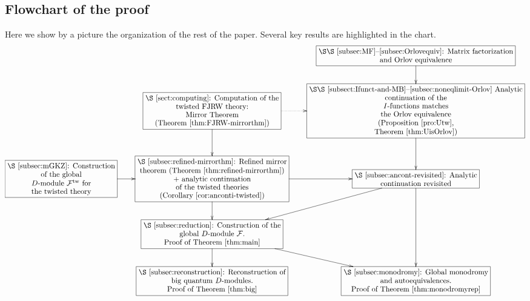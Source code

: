 \documentclass[11pt]{amsart}
\theoremstyle{definition} %
\theoremstyle{remark} %
\newcommand{\tw}{{\rm tw}}
\newcommand{\cF}{\mathcal{F}}
\begin{document}
\subsection{Flowchart of the proof} 
\label{subsec:flowchart} 
Here we show by a picture 
the organization of the rest of the paper. 
Several key results are highlighted in the chart. 
\[
\xymatrix{
& 
& 
*+[F]\txt{\S\S \ref{subsec:MF}--\ref{subsec:Orlovequiv}: 
Matrix factorization \\ and Orlov equivalence }
\ar[d] \\ 
& 
*+[F]\txt{\S \ref{sect:computing}:  
Computation of the \\ 
twisted FJRW theory: \\ 
Mirror Theorem \\
(Theorem \ref{thm:FJRW-mirrorthm})} 
 \ar[d] 
 \ar@{.>}[r]
& 
*+[F]\txt{\S\S 
\ref{subsect:Ifunct-and-MB}--\ref{subsec:noneqlimit-Orlov} 
Analytic \\ continuation 
of the \\ 
$I$-functions matches  \\ 
the Orlov equivalence \\ 
(Proposition \ref{pro:Utw},  \\ 
Theorem \ref{thm:UisOrlov})}
\ar[d] \\ 
*+[F]\txt{\S \ref{subsec:mGKZ}: 
Construction \\ 
of the global  \\ 
$D$-module $\cF^\tw$ for \\
 the twisted theory} 
\ar[r] 
&
*+[F]\txt{\S 
\ref{subsec:refined-mirrorthm}: 
Refined mirror \\ theorem  
(Theorem \ref{thm:refined-mirrorthm}) \\
$+$ analytic continuation \\ 
of the twisted theories \\ 
(Corollary \ref{cor:anconti-twisted}) 
}
\ar[r] 
\ar[d] 
& 
*+[F]\txt{\S \ref{subsec:ancont-revisited}: 
Analytic \\ continuation revisited} 
\ar[dd] 
\ar[dl] 
\\
&  
*+[F]\txt{\S \ref{subsec:reduction}: 
Construction of the \\ 
global $D$-module $\cF$. \\
Proof of Theorem \ref{thm:main}}
\ar[d] 
\ar[dr]
& 
\\
& 
*+[F]\txt{\S \ref{subsec:reconstruction}: 
Reconstruction of \\ 
big quantum $D$-modules. \\ 
Proof of Theorem \ref{thm:big} 
}
&
*+[F]\txt{\S \ref{subsec:monodromy}: 
Global monodromy \\ 
and autoequivalences. \\  
Proof of Theorem \ref{thm:monodromyrep}}
}
\]
\end{document}
